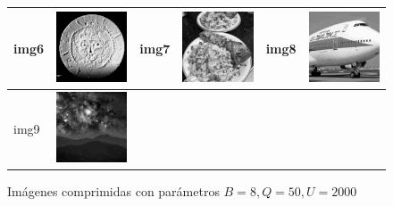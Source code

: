 \documentclass{article}
\begin{document}
\begin{figure}[!htp]
\begin{center}
\begin{tabular}[t]{|ll|ll|ll|}
\hline
img6 & \includegraphics[width=3cm]{../imgs/output/gray_8_50_2000/img06.png} &
img7 & \includegraphics[width=3cm]{../imgs/output/gray_8_50_2000/img07.png} &
img8 & \includegraphics[width=3cm]{../imgs/output/gray_8_50_2000/img08.png} \\
\hline
img9 & \includegraphics[width=3cm]{../imgs/output/gray_8_50_2000/img09.png} &&&& \\
\hline
\end{tabular}
\end{center}
\caption{Imágenes comprimidas con parámetros $B=8, Q=50, U=2000$}
\label{fig:imagenes_de_prueba_comprimidas_8_50_2000}
\end{figure}
\end{document}
